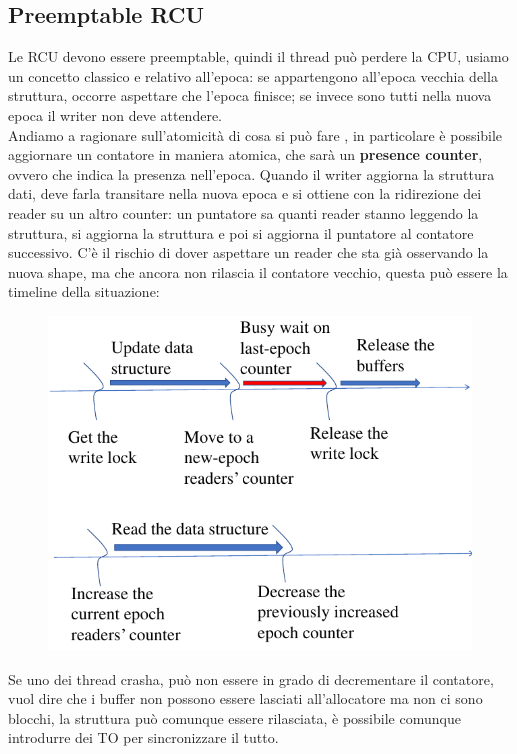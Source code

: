 \documentclass[12pt, oneside]{extbook}
\begin{document}
\subsection{Preemptable RCU}
Le RCU devono essere preemptable, quindi il thread può perdere la CPU, usiamo un concetto classico e relativo all'epoca: se appartengono all'epoca vecchia della struttura, occorre aspettare che l'epoca finisce; se invece sono tutti nella nuova epoca il writer non deve attendere.\\ Andiamo a ragionare sull'atomicità di cosa si può fare , in particolare è possibile aggiornare un contatore in maniera atomica, che sarà un \textbf{presence counter}, ovvero che indica la presenza nell'epoca. Quando il writer aggiorna la struttura dati, deve farla transitare nella nuova epoca e si ottiene con la ridirezione dei reader su un altro counter: un puntatore sa quanti reader stanno leggendo la struttura, si aggiorna la struttura e poi si aggiorna il puntatore al contatore successivo. C'è il rischio di dover aspettare un reader che sta già osservando la nuova shape, ma che ancora non rilascia il contatore vecchio, questa può essere la timeline della situazione:
\begin{figure}[!h]
\includegraphics[scale=0.5]{immagini/preempt_rcu.png}
\end{figure}
Se uno dei thread crasha, può non essere in grado di decrementare il contatore, vuol dire che i buffer non possono essere lasciati all'allocatore ma non ci sono blocchi, la struttura può comunque essere rilasciata, è possibile comunque introdurre dei TO per sincronizzare il tutto.
\end{document}
